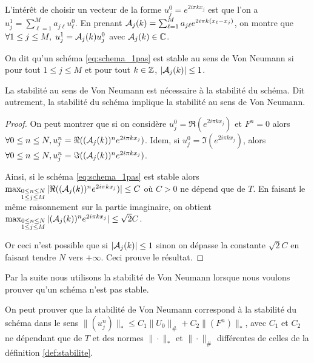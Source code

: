 \documentclass[12pt,a4paper,twoside]{article}
\begin{document}
L'int\'er\^et de choisir un vecteur de la forme $u_j^0 = e^{2 i \pi k x_j}$
est que l'on a $u_j^1 = \sum_{\ell=1}^{M} a_{j \ell} u_{\ell}^{0}$.
En prenant $\mathcal{A}_j(k) = \sum_{\ell=1}^{M} a_{j\ell} e^{2i\pi k (x_{\ell} - x_j)}$, on montre
que $\forall 1\leq j \leq M, \;  u_j^{1} = \mathcal{A}_j(k) u_j^0$ avec $\mathcal{A}_j(k) \in \mathbb{C}$.
\begin{definition}
  On dit qu'un sch\'ema \eqref{eq:schema_1pas} est stable au
  sens de Von Neumann si pour tout $1 \leq j \leq M$ 
  et pour tout $k \in \mathbb{Z}$, $| \mathcal{A}_j(k) | \leq 1$.
\end{definition}
\begin{proposition}
  \label{prop:Von_Neumann_nec}
  La stabilit\'e au sens de Von Neumann est n\'ecessaire \`a la stabilit\'e du sch\'ema.
  Dit autrement, la stabilit\'e du sch\'ema implique la stabilit\'e au sens de 
  Von Neumann.
\end{proposition}
\begin{proof}
  On peut montrer que si on consid\`ere $u_j^0 = \Re (e^{2 i \pi k x_j})$
  et $F^n = 0$
  alors $\forall 0 \leq n \leq N, u_j^n = \Re ((\mathcal{A}_j(k))^n e^{2 i \pi k x_j})$.
  Idem, si $u_j^0 = \Im (e^{2 i \pi k x_j})$, 
  alors $\forall 0 \leq n \leq N, u_j^n = \Im ((\mathcal{A}_j(k))^n e^{2 i \pi k x_j})$.
  
  Ainsi, si le sch\'ema \eqref{eq:schema_1pas} est stable alors
  $\max_{\substack{0 \leq n \leq N \\ 1 \leq j \leq M}} 
  | \Re ((\mathcal{A}_j(k))^n e^{2 i \pi k x_j})| \leq C$ o\`u $C>0$ ne d\'epend que de $T$.
  En faisant le m\^eme raisonnement sur la partie imaginaire,
  on obtient
  $\max_{\substack{0 \leq n \leq N \\ 1 \leq j \leq M}} 
  | (\mathcal{A}_j(k))^n e^{2 i \pi k x_j}| \leq \sqrt{2}C$.
  
  Or ceci n'est possible que si $| \mathcal{A}_j(k) | \leq 1$ sinon on d\'epasse
  la constante $\sqrt{2}C$ en faisant tendre $N$ vers $+\infty$.
  Ceci prouve le r\'esultat.
\end{proof}


Par la suite nous utilisons la stabilit\'e de Von Neumann lorsque nous voulons 
prouver qu'un sch\'ema n'est pas stable.

\begin{remark}
  On peut prouver que la
  stabilit\'e de Von Neumann correspond \`a la stabilit\'e du sch\'ema 
  dans le sens $\| (u_j^n) \|_{*} \leq C_1 \| U_0 \|_{\#} + C_2 \| (F^n) \|_{*}$,
  avec $C_1$ et $C_2$ ne d\'ependant que de $T$
  et des normes $\| \cdot \|_{*}$ et $\| \cdot \|_{\#}$ diff\'erentes de celles
  de la d\'efinition \ref{def:stabilite}.
\end{remark}
\end{document}
